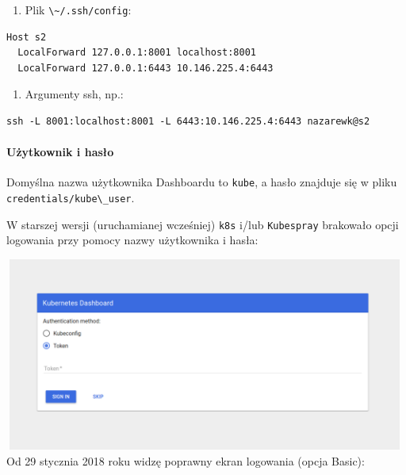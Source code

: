 \documentclass[a4paper,12pt,twoside,openany]{report}
\providecommand{\tightlist}{%
  \setlength{\itemsep}{0pt}\setlength{\parskip}{0pt}}
\newcommand{\passthrough}[1]{#1}
\begin{document}
\begin{enumerate}
\def\labelenumi{\arabic{enumi}.}
\tightlist
\item
  Plik \passthrough{\lstinline!\~/.ssh/config!}:
\end{enumerate}

\begin{lstlisting}
Host s2
  LocalForward 127.0.0.1:8001 localhost:8001
  LocalForward 127.0.0.1:6443 10.146.225.4:6443
\end{lstlisting}

\begin{enumerate}
\def\labelenumi{\arabic{enumi}.}
\setcounter{enumi}{1}
\tightlist
\item
  Argumenty ssh, np.:
\end{enumerate}

\begin{lstlisting}
ssh -L 8001:localhost:8001 -L 6443:10.146.225.4:6443 nazarewk@s2
\end{lstlisting}

\hypertarget{uux17cytkownik-i-hasux142o}{%
\paragraph{Użytkownik i hasło}\label{uux17cytkownik-i-hasux142o}}

Domyślna nazwa użytkownika Dashboardu to \passthrough{\lstinline!kube!},
a hasło znajduje się w pliku
\passthrough{\lstinline!credentials/kube\_user!}.

W starszej wersji (uruchamianej wcześniej) \passthrough{\lstinline!k8s!}
i/lub \passthrough{\lstinline!Kubespray!} brakowało opcji logowania przy
pomocy nazwy użytkownika i hasła:

\includegraphics[width=5.20833in,height=2.5in]{assets/dashboard-login-old.png}\\
Od 29 stycznia 2018 roku widzę poprawny ekran logowania (opcja Basic):
\end{document}
